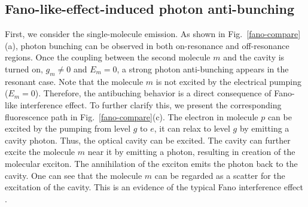 \documentclass[aps,prb,
superscriptaddress,
,twocolumn
,floatfix,footinbib,longbibliography,
]{revtex4-2}
\begin{document}
\subsection{Fano-like-effect-induced photon anti-bunching}
 First, we consider the single-molecule emission.
As shown in Fig.~\ref{fano-compare}(a), photon bunching can be observed in both on-resonance and off-resonance regions. 
Once the coupling between the second molecule $m$ and the cavity is turned on, $g_{m}\neq0$ and $E_{m}=0$, a strong photon anti-bunching appears in the resonant case.
Note that the molecule $m$ is not excited by the electrical pumping ($E_{m}=0$). Therefore, the antibuching behavior is a direct consequence of Fano-like interference effect.
To further clarify this, we present the corresponding fluorescence path in Fig.~\ref{fano-compare}(c). The electron in molecule $p$ can be excited by the pumping from level $g$ to $e$, it can relax to level $g$ by emitting a cavity photon. Thus, the optical cavity can be excited. The cavity can further excite the molecule $m$ near it by emitting a photon, resulting in creation of the molecular exciton.
The annihilation of the exciton emits the photon back to the cavity. One can see that the molecule $m$ can be regarded as a scatter for the excitation of the cavity. This is an evidence of the typical Fano interference effect \cite{PhysRev.124.1866,RevModPhys.82.2257}.
\end{document}
